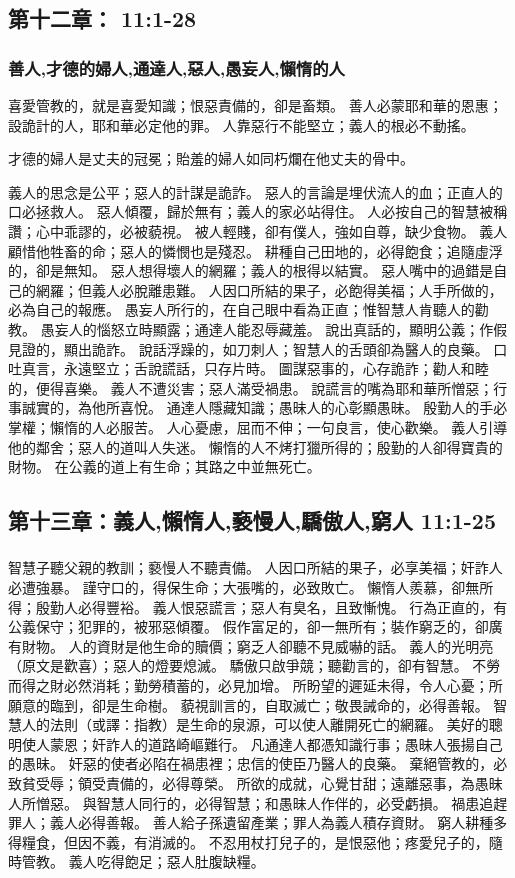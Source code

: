 \subsection{第十二章：   11:1-28}
\subsubsection{善人,才德的婦人,通達人,惡人,愚妄人,懶惰的人}
喜愛管教的，就是喜愛知識；恨惡責備的，卻是畜類。
善人必蒙耶和華的恩惠；設詭計的人，耶和華必定他的罪。
人靠惡行不能堅立；義人的根必不動搖。

才德的婦人是丈夫的冠冕；貽羞的婦人如同朽爛在他丈夫的骨中。

義人的思念是公平；惡人的計謀是詭詐。
惡人的言論是埋伏流人的血；正直人的口必拯救人。
惡人傾覆，歸於無有；義人的家必站得住。
人必按自己的智慧被稱讚；心中乖謬的，必被藐視。
被人輕賤，卻有僕人，強如自尊，缺少食物。
義人顧惜他牲畜的命；惡人的憐憫也是殘忍。
耕種自己田地的，必得飽食；追隨虛浮的，卻是無知。
惡人想得壞人的網羅；義人的根得以結實。
惡人嘴中的過錯是自己的網羅；但義人必脫離患難。
人因口所結的果子，必飽得美福；人手所做的，必為自己的報應。
愚妄人所行的，在自己眼中看為正直；惟智慧人肯聽人的勸教。
愚妄人的惱怒立時顯露；通達人能忍辱藏羞。
說出真話的，顯明公義；作假見證的，顯出詭詐。
說話浮躁的，如刀刺人；智慧人的舌頭卻為醫人的良藥。
口吐真言，永遠堅立；舌說謊話，只存片時。
圖謀惡事的，心存詭詐；勸人和睦的，便得喜樂。
義人不遭災害；惡人滿受禍患。
說謊言的嘴為耶和華所憎惡；行事誠實的，為他所喜悅。
通達人隱藏知識；愚昧人的心彰顯愚昧。
殷勤人的手必掌權；懶惰的人必服苦。
人心憂慮，屈而不伸；一句良言，使心歡樂。
義人引導他的鄰舍；惡人的道叫人失迷。
懶惰的人不烤打獵所得的；殷勤的人卻得寶貴的財物。
在公義的道上有生命；其路之中並無死亡。



\subsection{第十三章：義人,懶惰人,褻慢人,驕傲人,窮人  11:1-25}
\subsubsection{ }
智慧子聽父親的教訓；褻慢人不聽責備。
人因口所結的果子，必享美福；奸詐人必遭強暴。
謹守口的，得保生命；大張嘴的，必致敗亡。
懶惰人羨慕，卻無所得；殷勤人必得豐裕。
義人恨惡謊言；惡人有臭名，且致慚愧。
行為正直的，有公義保守；犯罪的，被邪惡傾覆。
假作富足的，卻一無所有；裝作窮乏的，卻廣有財物。
人的資財是他生命的贖價；窮乏人卻聽不見威嚇的話。
義人的光明亮（原文是歡喜）；惡人的燈要熄滅。
驕傲只啟爭競；聽勸言的，卻有智慧。
不勞而得之財必然消耗；勤勞積蓄的，必見加增。
所盼望的遲延未得，令人心憂；所願意的臨到，卻是生命樹。
藐視訓言的，自取滅亡；敬畏誡命的，必得善報。
智慧人的法則（或譯：指教）是生命的泉源，可以使人離開死亡的網羅。
美好的聰明使人蒙恩；奸詐人的道路崎嶇難行。
凡通達人都憑知識行事；愚昧人張揚自己的愚昧。
奸惡的使者必陷在禍患裡；忠信的使臣乃醫人的良藥。
棄絕管教的，必致貧受辱；領受責備的，必得尊榮。
所欲的成就，心覺甘甜；遠離惡事，為愚昧人所憎惡。
與智慧人同行的，必得智慧；和愚昧人作伴的，必受虧損。
禍患追趕罪人；義人必得善報。
善人給子孫遺留產業；罪人為義人積存資財。
窮人耕種多得糧食，但因不義，有消滅的。
不忍用杖打兒子的，是恨惡他；疼愛兒子的，隨時管教。
義人吃得飽足；惡人肚腹缺糧。

